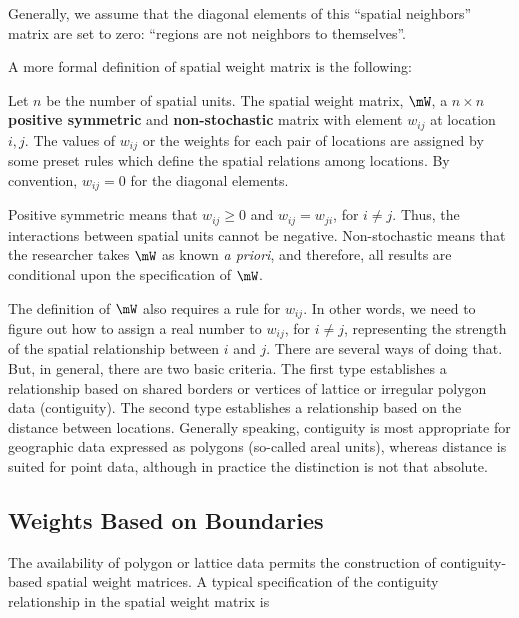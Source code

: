 Generally, we assume that the diagonal elements of this ``spatial neighbors'' matrix are set to zero: ``regions are not neighbors to themselves''.

A more formal definition of spatial weight matrix is the following:

\begin{definition}\label{def:W}
  Let $n$ be the number of spatial units. The spatial weight matrix, $\mW$, a $n\times n$ \textbf{positive symmetric} and \textbf{non-stochastic} matrix with element $w_{ij}$ at location $i,j$. The values of $w_{ij}$ or the weights for each pair of locations are assigned by some preset rules which define the spatial relations among locations. By convention, $w_{ij} = 0$ for the diagonal elements.
\end{definition}

Positive symmetric means that $w_{ij}\geq 0$ and $w_{ij} = w_{ji}$, for $i\neq j$. Thus, the interactions between spatial units cannot be negative. Non-stochastic means that the researcher takes $\mW$ as known \emph{a priori}, and therefore, all results are conditional upon the specification of $\mW$.

The definition of $\mW$ also requires a rule for $w_{ij}$. In other words, we need to figure out how to assign a real number to $w_{ij}$, for $i\neq j$, representing the strength of the spatial relationship between $i$ and $j$. There are several ways of doing that. But, in general, there are two basic criteria. The first type establishes a relationship based on shared borders or vertices of lattice or irregular polygon data (contiguity). The second type establishes a relationship based on the distance between locations. Generally speaking, contiguity is most appropriate for geographic data expressed as polygons (so-called areal units), whereas distance is suited for point data, although in practice the distinction is not that absolute. 

\subsection{Weights Based on Boundaries}

The availability of polygon or lattice data permits the construction of contiguity-based spatial weight matrices. A typical specification of the contiguity relationship in the spatial weight matrix is

